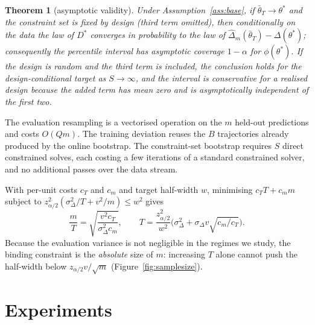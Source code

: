 \documentclass[pdflatex,sn-basic]{sn-jnl}
\newtheorem{theorem}{Theorem}
\newcommand{\dhat}{\hat\Delta}
\newcommand{\tbar}{\bar\theta}
\begin{document}
\begin{theorem}[asymptotic validity]
\label{thm:joint}
Under Assumption~\ref{ass:base}, if $\tbar_T\to\theta^*$ and the constraint set is fixed by
design (third term omitted), then conditionally on the data the law of $D^*$ converges in
probability to the law of $\dhat_m(\tbar_T)-\Delta(\theta^*)$; consequently the percentile interval
has asymptotic coverage $1-\alpha$ for $\phi(\theta^*)$.  If the design is random and the third term is included, the conclusion holds for the design-conditional target as $S\to\infty$, and the interval is conservative for a realised design because the added term has mean zero and is asymptotically independent of the first two.
\end{theorem}


The evaluation resampling is a vectorised operation on the $m$ held-out
predictions and costs $O(Qm)$.  The training deviation reuses the $B$ trajectories already produced
by the online bootstrap.  The constraint-set bootstrap requires $S$ direct constrained solves, each
costing a few iterations of a standard constrained solver, and no additional passes over the data
stream.


\label{sec:ss}
With per-unit costs $c_T$ and $c_m$ and target half-width $w$, minimising $c_T T+c_m m$ subject to
$z_{\alpha/2}^2(\sigma^2_\Delta/T+v^2/m)\le w^2$ gives
\[
\frac{m}{T}=\sqrt{\frac{v^2c_T}{\sigma^2_\Delta c_m}},\qquad
T=\frac{z_{\alpha/2}^2}{w^2}\Big(\sigma^2_\Delta+\sigma_\Delta v\sqrt{c_m/c_T}\Big).
\]
Because the evaluation variance is not negligible in the regimes we study, the binding
constraint is the \emph{absolute} size of $m$: increasing $T$ alone cannot push the half-width below
$z_{\alpha/2}v/\sqrt m$ (Figure~\ref{fig:samplesize}).

\section{Experiments}
\label{sec:exp}

\end{document}
